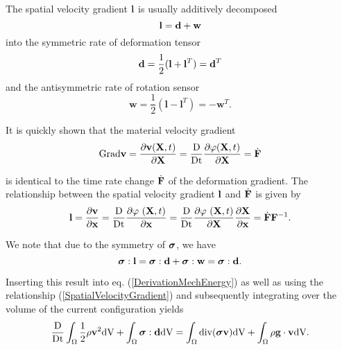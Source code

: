 The spatial velocity gradient $\mathbf {l} $ is usually additively decomposed 
 \begin{equation}
\mathbf {l}  =  \mathbf {d}  + \mathbf {w} 
\label{SpatialVelocityGradient}
\end{equation}
into the symmetric rate of deformation tensor 
 \begin{equation}
\mathbf {d}  = \frac{1}{2} (\mathbf {l}  + \mathbf {l}  ^T) = \mathbf {d}  ^T
\end{equation}
and the antisymmetric rate of rotation sensor
 \begin{equation}
\mathbf {w} = \frac{1}{2} (\mathbf l - \mathbf l ^T) = - \mathbf w ^T.
\end{equation}

It is quickly shown that the material velocity gradient
 \begin{equation}
  \textnormal{Grad} \mathbf {v}  = \frac{\partial \mathbf {v}  ( \mathbf {X}  , t)}{\partial \mathbf {X} } =  \frac{\textnormal{D}}{\textnormal{Dt}} \frac{\partial \varphi ( \mathbf {X}  , t)}{\partial \mathbf {X} } = \dot{\mathbf {F }} 
\label{MaterialVelocityGradient}
\end{equation}

is identical to the time rate change $\dot{\mathbf {F }} $ of the deformation gradient. The relationship between the spatial velocity gradient $\mathbf {l} $ and $\dot{\mathbf {F }} $ is given by
 \begin{equation}
\mathbf {l}   = \frac{\partial \mathbf {v} }{\partial \mathbf {x} } =  \frac{\textnormal{D}}{\textnormal{Dt}} \frac{\partial \varphi\ ( \mathbf X , t)}{\partial \mathbf {x} } =  \frac{\textnormal{D}}{\textnormal{Dt}} \frac{\partial \varphi\ ( \mathbf X , t)}{\partial \mathbf {X} } \frac{\partial{\ensuremath{\mathbf {X} }} }{\partial{\ensuremath{\mathbf {x} }} } = \dot{\mathbf {F }}  \mathbf {F } ^{-1}.
\label{SpatialVelocityGradientAndDeformationGradient}
\end{equation}

We note that due to the symmetry of $\boldsymbol{\sigma}$, we have
 \begin{equation}
\boldsymbol{\sigma} : \mathbf {l}   = \boldsymbol{\sigma} : \mathbf {d} + \boldsymbol{\sigma} : \mathbf {w}  = \boldsymbol{\sigma} : \mathbf {d} .
\end{equation}

Inserting this result into eq. (\ref{DerivationMechEnergy}) as well as using the relationship (\ref{SpatialVelocityGradient}) and subsequently integrating over the volume of the current configuration yields
\begin{equation}
   \frac{\textnormal{D}}{\textnormal{Dt}} \int_{ \Omega} \frac{1}{2} \rho \mathbf {v} ^2  \textnormal{dV} +   \int_{ \Omega} \boldsymbol{\sigma} : \mathbf {d}    \textnormal{dV}     =  \int_{ \Omega}   \textnormal{div} ( \boldsymbol{\sigma} \mathbf {v}  )  \textnormal{dV} + \int_{ \Omega} \rho \mathbf {g}  \cdot \mathbf {v}   \textnormal{dV}.
\end{equation}

